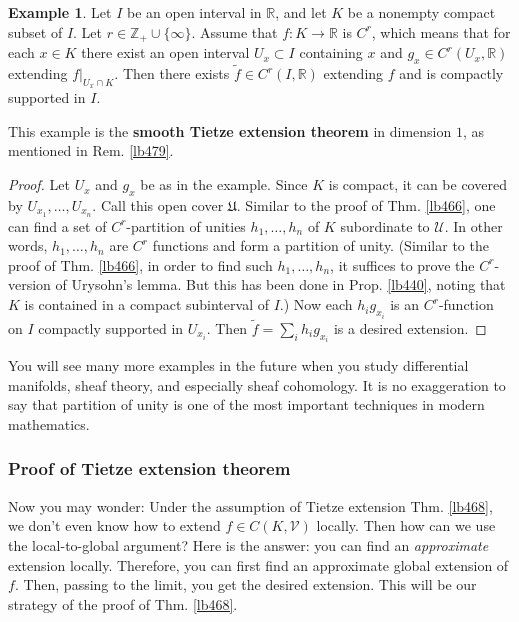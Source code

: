 \documentclass[12pt,b5paper,notitlepage]{article}
\theoremstyle{definition}
\newtheorem{eg}[df]{Example}
\theoremstyle{plain}
\newcommand{\fk}{\mathfrak}
\newcommand{\mc}{\mathcal}
\newcommand{\wtd}{\widetilde}
\newcommand{\Zbb}{\mathbb Z}
\newcommand{\Rbb}{\mathbb R}
\numberwithin{equation}{section}
\begin{document}
\begin{eg}\label{lb478}
Let $I$ be an open interval in $\Rbb$, and let $K$ be a nonempty compact subset of $I$. Let $r\in\Zbb_+\cup\{\infty\}$. Assume that $f:K\rightarrow\Rbb$ is $C^r$, which means that for each $x\in K$ there exist an open interval $U_x\subset I$ containing $x$ and $g_x\in C^r(U_x,\Rbb)$ extending $f|_{U_x\cap K}$. Then there exists $\wtd f\in C^r(I,\Rbb)$ extending $f$ and is compactly supported in $I$. 
\end{eg}

This example is the \textbf{smooth Tietze extension theorem} in dimension $1$, as mentioned in Rem. \ref{lb479}.

\begin{proof}
Let $U_x$ and $g_x$ be as in the example. Since $K$ is compact, it can be covered by $U_{x_1},\dots,U_{x_n}$. Call this open cover $\fk U$. Similar to the proof of Thm. \ref{lb466}, one can find a set of $C^r$-partition of unities $h_1,\dots,h_n$ of $K$ subordinate to $\mc U$. In other words, $h_1,\dots,h_n$ are $C^r$ functions and form a partition of unity. (Similar to the proof of Thm. \ref{lb466}, in order to find such $h_1,\dots,h_n$, it suffices to prove the $C^r$-version of Urysohn's lemma. But this has been done in Prop. \ref{lb440}, noting that $K$ is contained in a compact subinterval of $I$.) Now each $h_ig_{x_i}$ is an $C^r$-function on $I$ compactly supported in $U_{x_i}$. Then $\wtd f=\sum_i h_ig_{x_i}$ is a desired extension.
\end{proof}



You will see many more examples in the future when you study differential manifolds, sheaf theory, and especially sheaf cohomology. It is no exaggeration to say that partition of unity is one of the most important techniques in modern mathematics.




\subsubsection{Proof of Tietze extension theorem}




Now you may wonder: Under the assumption of Tietze extension Thm. \ref{lb468}, we don't even know how to extend $f\in C(K,\mc V)$ locally. Then how can we use the local-to-global argument? Here is the answer: you can find an \textit{approximate} extension locally. Therefore, you can first find an approximate global extension of $f$. Then, passing to the limit, you get the desired extension. This will be our strategy of the proof of Thm. \ref{lb468}.
\end{document}
